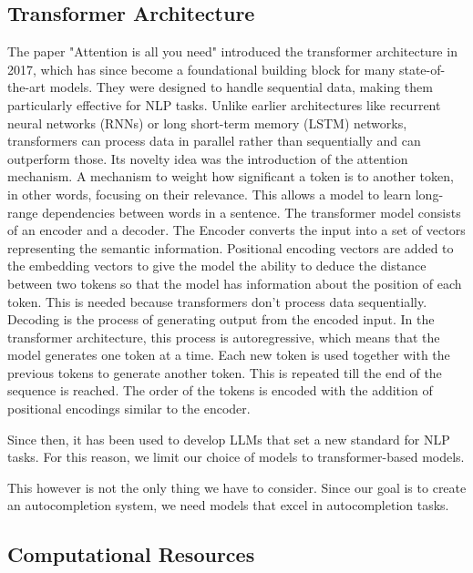 \subsection{Transformer Architecture}
The paper "Attention is all you need" \cite{NIPS2017_3f5ee243}  introduced the transformer architecture in 2017, which has since become a foundational building block for many state-of-the-art models. They were designed to handle sequential data, making them particularly effective for NLP tasks. Unlike earlier architectures like recurrent neural networks (RNNs) or long short-term memory (LSTM) networks, transformers can process data in parallel rather than sequentially and can outperform those.
Its novelty idea was the introduction of the attention mechanism. A mechanism to weight how significant a token is to another token, in other words, focusing on their relevance. This allows a model to learn long-range dependencies between words in a sentence. The transformer model consists of an encoder and a decoder. The Encoder converts the input into a set of vectors representing the semantic information. Positional encoding vectors are added to the embedding vectors to give the model the ability to deduce the distance between two tokens so that the model has information about the position of each token. This is needed because transformers don't process data sequentially. 
Decoding is the process of generating output from the encoded input. In the transformer architecture, this process is autoregressive, which means that the model generates one token at a time. Each new token is  used together with the previous tokens to generate 
another token. This is repeated till the end of the sequence is reached.
The order of the tokens is encoded with the addition of positional encodings similar to the encoder.

Since then, it has been used to develop LLMs that set a new standard for NLP tasks.
For this reason, we limit our choice of models to transformer-based models.






This however is not the only thing we have to consider. Since our goal is to create an autocompletion system, we need models that excel in autocompletion tasks.



\subsection{Computational Resources}


